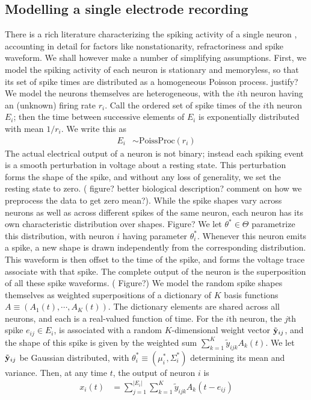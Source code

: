 \subsection{Modelling a single electrode recording}
There is a rich literature characterizing the spiking activity of a single neuron \citep{}, accounting in detail for factors like nonstationarity, 
refractoriness and spike waveform. We shall however make a number of simplifying assumptions. First, we model the spiking activity of each neuron is 
stationary and memoryless, so that its set of spike times are 
distributed as a homogeneous Poisson process. 
{\color{red} justify?} We model the neurons themselves are heterogeneous, with the $i$th neuron having
an (unknown) firing rate $r_i$. Call the ordered set of spike times of the $i$th neuron $E_i$; then the time between successive elements of $E_i$ is 
exponentially distributed with mean $1/r_i$. We write this as
\begin{align}
  E_i &\sim \text{PoissProc}(r_i)
\end{align}
The actual electrical output of a neuron is not binary; instead each spiking event is a smooth perturbation in voltage about a
resting state. This perturbation forms the shape of the spike, and without any loss of generality, we set the resting state to zero. 
{(\color{red} figure? better biological description? comment on how we preprocess the data to get zero mean?)}. 
While the spike shapes vary across neurons as well as across different spikes of the same neuron, each 
neuron has its own characteristic distribution over shapes. {\color{red} Figure? } 
We let $\theta^* \in \Theta$ parametrize this distribution, with neuron $i$ having parameter $\theta^*_i$. Whenever this neuron emits a 
spike, a new shape is drawn independently from the corresponding distribution. %
This waveform is then offset to the time of the spike, and forms the voltage trace associate with that spike. The complete output of the neuron is the 
superposition of all these spike waveforms. 
{\color{red} ( Figure?)} %
We model the random spike shapes themselves as weighted superpositions of a dictionary of $K$ basis functions $A \equiv (A_1(t), \cdots, A_K(t))$. The
dictionary elements are shared across all neurons, and each is a real-valued function of time.
For the $i$th neuron, the $j$th spike $e_{ij} \in E_i$, is associated with a random $K$-dimensional weight vector $\tilde{\mathbf{y}}_{ij}$, and the 
shape of this spike is given by the weighted sum $\sum_{k=1}^K \tilde{y}_{ijk} A_k(t)$. We let $\tilde{\mathbf{y}}_{ij}$ be Gaussian distributed, with 
$\theta^*_i \equiv (\mu^*_i, \Sigma^*_i)$ determining its 
mean and variance. Then, at any time $t$, the output of neuron $i$ is
\begin{align}
  x_{i}(t) &= \sum_{j=1}^{|E_i|} \sum_{k=1}^K \tilde{y}_{ijk} A_k(t - e_{ij})
\end{align}

